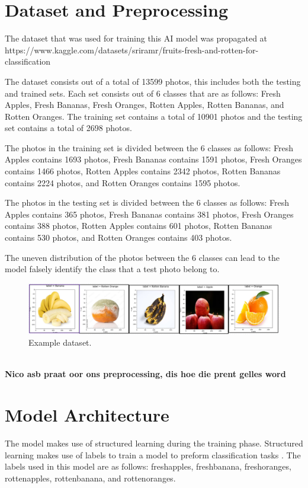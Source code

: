 \documentclass[conference]{IEEEtran}
\begin{document}
\section{Dataset and Preprocessing}

The dataset that was used for training this AI model was propagated at https://www.kaggle.com/datasets/sriramr/fruits-fresh-and-rotten-for-classification

The dataset consists out of a total of 13599 photos, this includes both the testing and trained sets. Each set consists out of 6 classes that are as follows: Fresh Apples, Fresh Bananas, Fresh Oranges, Rotten Apples, Rotten Bananas, and Rotten Oranges. The training set contains a total of 10901 photos and the testing set contains a total of 2698 photos.

The photos in the training set is divided between the 6 classes as follows: Fresh Apples contains 1693 photos, Fresh Bananas contains 1591 photos, Fresh Oranges contains 1466 photos, Rotten Apples contains 2342 photos, Rotten Bananas contains 2224 photos, and Rotten Oranges contains 1595 photos.

The photos in the testing set is divided between the 6 classes as follows: Fresh Apples contains 365 photos, Fresh Bananas contains 381 photos, Fresh Oranges contains 388 photos, Rotten Apples contains 601 photos, Rotten Bananas contains 530 photos, and Rotten Oranges contains 403 photos.

The uneven distribution of the photos between the 6 classes can lead to the model falsely identify the class that a test photo belong to.
\begin{figure}[h]
    \centering
    \includegraphics[width=\linewidth]{Example data.png}
    \caption{Example dataset.}
    \label{fig}
\end{figure}
\\
\textbf{Nico asb praat oor ons preprocessing, dis hoe die prent gelles word}

\section{Model Architecture}

The model makes use of structured learning during the training phase. Structured learning makes use of labels to train a model to preform classification tasks \cite{b1}. The labels used in this model are as follows: freshapples, freshbanana, freshoranges, rottenapples, rottenbanana, and rottenoranges.
\end{document}
